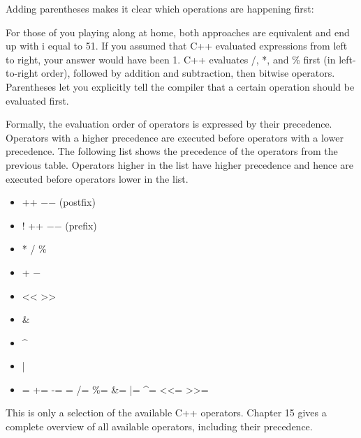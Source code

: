 Adding parentheses makes it clear which operations are happening first:


For those of you playing along at home, both approaches are equivalent and end up with i equal to 51. If you assumed that C++ evaluated expressions from left to right, your answer would have been 1. C++ evaluates /, *, and \% first (in left-to-right order), followed by addition and subtraction, then bitwise operators. Parentheses let you explicitly tell the compiler that a certain operation should be evaluated first.

Formally, the evaluation order of operators is expressed by their precedence. Operators with a higher precedence are executed before operators with a lower precedence. The following list shows the precedence of the operators from the previous table. Operators higher in the list have higher precedence and hence are executed before operators lower in the list.

\begin{itemize}
\item
++ \enspace −− (postfix)

\item
! \enspace ++ \enspace −− (prefix)

\item
* \enspace / \enspace \%

\item
+ \enspace −

\item
<{}< \enspace >{}>

\item
\&

\item
\textasciicircum

\item
|

\item
= \enspace += \enspace -= \enspace *= \enspace /= \enspace \%= \enspace \&= \enspace |= \enspace \textasciicircum= \enspace <{}<= \enspace >{}>=

\end{itemize}

This is only a selection of the available C++ operators. Chapter 15 gives a complete overview of all available operators, including their precedence.



